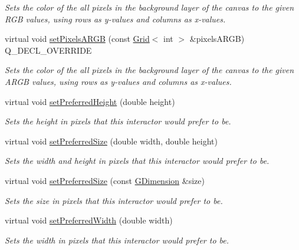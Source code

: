 \begin{DoxyCompactItemize}
\begin{DoxyCompactList}\small\item\em Sets the color of the all pixels in the background layer of the canvas to the given R\+GB values, using rows as y-\/values and columns as x-\/values. \end{DoxyCompactList}\item 
virtual void \mbox{\hyperlink{classGCanvas_a64dd4bc93e7f6555e9d96b956602c7c8}{set\+Pixels\+A\+R\+GB}} (const \mbox{\hyperlink{classGrid}{Grid}}$<$ int $>$ \&pixels\+A\+R\+GB) Q\+\_\+\+D\+E\+C\+L\+\_\+\+O\+V\+E\+R\+R\+I\+DE
\begin{DoxyCompactList}\small\item\em Sets the color of the all pixels in the background layer of the canvas to the given A\+R\+GB values, using rows as y-\/values and columns as x-\/values. \end{DoxyCompactList}\item 
virtual void \mbox{\hyperlink{classGInteractor_a1ab987704fce32098706c6f00fb08218}{set\+Preferred\+Height}} (double height)
\begin{DoxyCompactList}\small\item\em Sets the height in pixels that this interactor would prefer to be. \end{DoxyCompactList}\item 
virtual void \mbox{\hyperlink{classGInteractor_a042c5ae19430d765ef552371cae3632c}{set\+Preferred\+Size}} (double width, double height)
\begin{DoxyCompactList}\small\item\em Sets the width and height in pixels that this interactor would prefer to be. \end{DoxyCompactList}\item 
virtual void \mbox{\hyperlink{classGInteractor_aa22d9be4bc0e078bb0ea69b0fc9d7c75}{set\+Preferred\+Size}} (const \mbox{\hyperlink{classGDimension}{G\+Dimension}} \&size)
\begin{DoxyCompactList}\small\item\em Sets the size in pixels that this interactor would prefer to be. \end{DoxyCompactList}\item 
virtual void \mbox{\hyperlink{classGInteractor_a3db429ab2fa52efd187eec0ed8cdd9f2}{set\+Preferred\+Width}} (double width)
\begin{DoxyCompactList}\small\item\em Sets the width in pixels that this interactor would prefer to be. \end{DoxyCompactList}\item 

\end{DoxyCompactItemize}
